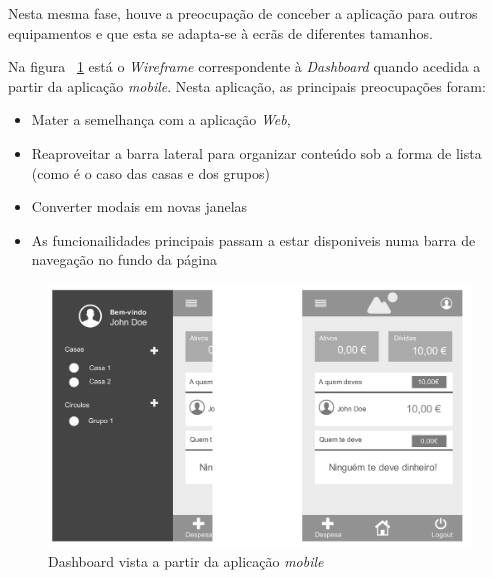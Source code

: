 Nesta mesma fase, houve a preocupação de conceber a aplicação para outros equipamentos e que esta se adapta-se à ecrãs de diferentes tamanhos.

Na figura ~\ref{fig:mockup_mobile} está o \emph{Wireframe} correspondente à \emph{Dashboard} quando acedida a partir da aplicação \emph{mobile}. Nesta aplicação, as principais preocupações foram:

\begin{itemize}
	\item Mater a semelhança com a aplicação \emph{Web},
	\item Reaproveitar a barra lateral para organizar conteúdo sob a forma de lista (como é o caso das casas e dos grupos)
	\item Converter modais em novas janelas
	\item As funcionailidades principais passam a estar disponiveis numa barra de navegação no fundo da página
\end{itemize}

\begin{figure}[H]
\centering
\includegraphics[width=.9\textwidth]{images/mobilemockup}
\caption{Dashboard vista a partir da aplicação \emph{mobile}}
\label{fig:mockup_mobile}
\end{figure}


